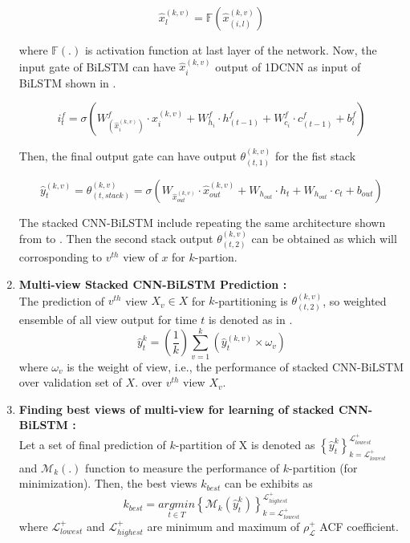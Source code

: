 \begin{enumerate}[label=(\alph*)]
\begin{equation} \label{1dd hat}
  \hat{x}_l^{(k, v)}=\mathbb{F} \left(\hat{x}_{(i, l)}^{(k, v)} \right)
\end{equation}

where $\mathbb{F}(.)$ is activation function at last layer of the network. Now,  the input gate of BiLSTM can have $\hat{x}_i^{(k, v)}$ output of 1DCNN as input of BiLSTM shown in .

\begin{equation}
\label{si}
  i_t^f = \sigma \left(W_{\left(\hat{x}_i^{(k, v)} \right)}^f  \cdot \hat{x}_i^{(k, v)} +W_{h_i}^f \cdot h_{(t-1)}^f +W_{c_i}^f \cdot c_{(t-1)}^f +b_i^f \right)
\end{equation}

Then, the final output gate can have output $\theta _{(t, 1)}^{(k, v)}$ for the fist stack

\begin{equation} \label{thi fin}
  \hat{y}_t^{(k, v)}=\theta _{(t, stack)}^{(k, v)}= \sigma \left(W_{\hat{x}_{out}^{(k, v)}} \cdot \hat{x}_{out}^{(k, v)} +  W_{h_{out}} \cdot h_t +W_{h_{out}} \cdot c_t +b_{out} \right)
\end{equation}

The stacked CNN-BiLSTM include repeating the same architecture shown from  to . Then the second stack output $\theta _{(t, 2)}^{(k, v)}$ can be obtained as  which will corrosponding  to $v^{th}$ view of $x$ for $k$-partion. 



  \item \textbf{Multi-view Stacked CNN-BiLSTM Prediction : }\\
  The prediction of $v^{th}$ view $X_v \in X$ for $k$-partitioning is $\theta_{(t, 2)}^{(k, v)} $, so weighted ensemble of all view output for time $t$ is denoted as in  .
  \begin{equation} \label{sta cb}
    \hat{y}_t^k= \left(\frac{1}{k} \right) \sum_{v=1}^{k} \left(\hat{y}_t^{(k, v)} \times \omega_v \right)
  \end{equation}
  where $\omega_v$ is the weight of view, i.e.,  the performance of stacked CNN-BiLSTM over validation set of $X$. over $v^{th}$ view $X_v$.



  \item \textbf{Finding best views of multi-view for learning of stacked CNN-BiLSTM : }\\
Let a set of final prediction of $k$-partition of X is denoted as  $\left\{\hat{y}_t^k \right\}_{k=\mathscr{L}_{lowest}^+}^{\mathscr{L}_{lowest}^+}$ and $\mathcal{M}_k(.)$ function to measure the performance of $k$-partition (for minimization). Then,  the best views $k_{best}$ can be exhibits as 
  \begin{equation} \label{bv}
    k_{best}=\underset{t \in T}{arg min} \left\{\mathcal{M}_k \left(\hat{y}_t^k \right) \right\}_{k=\mathscr{L}_{lowest}^+}^{\mathscr{L}_{highest}^+}
  \end{equation}
  where $\mathscr{L}_{lowest}^+$ and $\mathscr{L}_{highest}^+$ are minimum and maximum of $\rho_{\mathscr{L}}^+$ ACF coefficient.


\end{enumerate}
